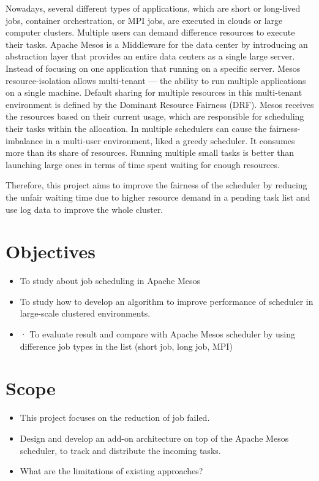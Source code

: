 \documentclass[12pt,oneside,openright,a4paper]{cpe-english-project}
\begin{document}
Nowadays, several different types of applications, which are short or long-lived jobs, container orchestration, or MPI jobs, are executed in clouds or large computer clusters. Multiple users can demand difference resources to execute their tasks. Apache Mesos is a Middleware for the data center by introducing an abstraction layer that provides an entire data centers as a single large server. Instead of focusing on one application that running on a specific server. Mesos resource-isolation allows multi-tenant — the ability to run multiple applications on a single machine. Default sharing for multiple resources in this multi-tenant environment is defined by the Dominant Resource Fairness (DRF). Mesos receives the resources based on their current usage, which are responsible for scheduling their tasks within the allocation. In multiple schedulers can cause the fairness-imbalance in a multi-user environment, liked a greedy scheduler. It consumes more than its share of resources. Running multiple small tasks is better than launching large ones in terms of time spent waiting for enough resources. 

Therefore, this project aims to improve the fairness of the scheduler by reducing the unfair waiting time due to higher resource demand in a pending task list and use log data to improve the whole cluster.


\section{Objectives}
\begin{itemize}
\item  To study about job scheduling in Apache Mesos
\item  To study how to develop an algorithm to improve performance of scheduler in large-scale clustered environments.
\item  ·	To evaluate result and compare with Apache Mesos scheduler by using difference job types in the list (short job, long job, MPI)
\end{itemize}


\section{Scope}
\begin{itemize}
\item  This project focuses on the reduction of job failed. 
\item  Design and develop an add-on architecture on top of the Apache Mesos scheduler, to track and distribute the incoming tasks.
\item  What are the limitations of existing approaches? 
\end{itemize}
\end{document}
